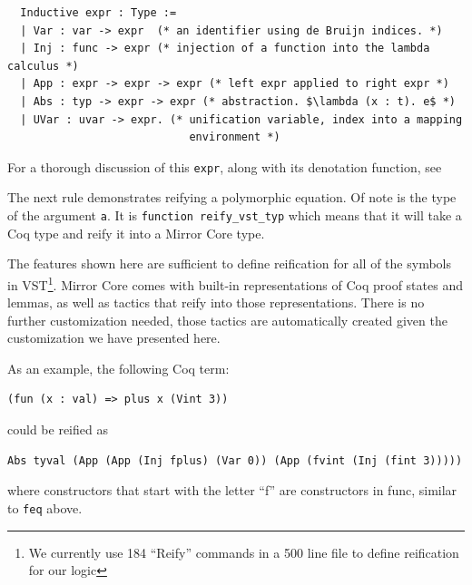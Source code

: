\documentclass{puthesis}
\begin{document}
\begin{lstlisting}
  Inductive expr : Type :=
  | Var : var -> expr  (* an identifier using de Bruijn indices. *)
  | Inj : func -> expr (* injection of a function into the lambda calculus *)
  | App : expr -> expr -> expr (* left expr applied to right expr *)
  | Abs : typ -> expr -> expr (* abstraction. $\lambda (x : t). e$ *)
  | UVar : uvar -> expr. (* unification variable, index into a mapping
                            environment *)
\end{lstlisting}

For a thorough discussion of this \lstinline|expr|, along with its
denotation function, see \cite[section~3.1]{malecha:thesis}

The next rule demonstrates reifying a polymorphic equation. Of note is
the type of the argument \lstinline|a|. It is 
\lstinline|function reify_vst_typ| which means that it will take a Coq
type and reify it into a Mirror Core type.

The features shown here are sufficient to define reification for all
of the symbols in VST\footnote{We currently use 184 ``Reify'' commands
  in a 500 line file to define reification for our logic}. Mirror Core
comes with built-in representations of Coq proof states and lemmas, as
well as tactics that reify into those representations. There is no
further customization needed, those tactics are automatically created
given the customization we have presented here.

As an example, the following Coq term:

\begin{lstlisting}
(fun (x : val) => plus x (Vint 3))
\end{lstlisting}

could be reified as

\begin{lstlisting}
Abs tyval (App (App (Inj fplus) (Var 0)) (App (fvint (Inj (fint 3)))))
\end{lstlisting}
where constructors that start with the letter ``f'' are constructors
in func, similar to \lstinline|feq| above.
\end{document}
